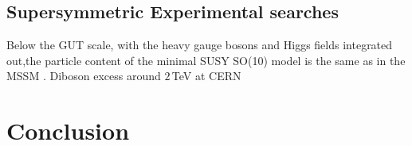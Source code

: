 \documentclass{article}
\begin{document}
\subsection{Supersymmetric Experimental searches}
\label{sec:GUTExp_SUSY}
Below the GUT scale, with the heavy gauge bosons and Higgs fields integrated out,the particle content of the minimal SUSY SO(10) model is the same as in the MSSM \cite{SO10SymFig}.
Diboson excess around $2\,$TeV at CERN \cite{LHCDiboson}
\section{Conclusion}%
\label{sec:Conclusion}




\end{document}
